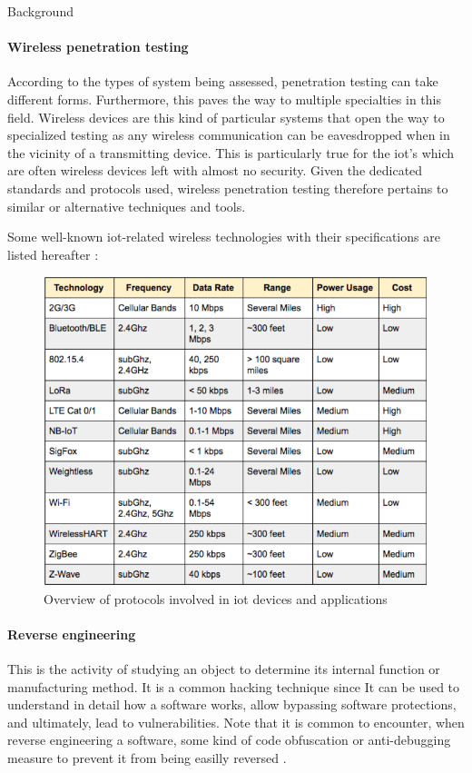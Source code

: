 \begin{chaptercover}{Background}
\paragraph{Wireless penetration testing} According to the types of system being assessed, penetration testing can take different forms. Furthermore, this paves the way to multiple specialties in this field. Wireless devices are this kind of particular systems that open the way to specialized testing as any wireless communication can be eavesdropped when in the vicinity of a transmitting device. This is particularly true for the \acrshort{iot}'s which are often wireless devices left with almost no security. Given the dedicated standards and protocols used, wireless penetration testing therefore pertains to similar or alternative techniques and tools.

Some well-known \acrshort{iot}-related wireless technologies with their specifications are listed hereafter :
\begin{figure}[H]
  \centering
  \includegraphics[width=.7\linewidth]{figures/wireless-technologies}
  \caption{Overview of protocols involved in \acrshort{iot} devices and applications \cite{iot-protocols}}
  \label{fig:wireless-technologies}
\end{figure}

\paragraph{Reverse engineering} This is the activity of studying an object to determine its internal function or manufacturing method. It is a common hacking technique since It can be used to understand in detail how a software works, allow bypassing software protections, and ultimately, lead to vulnerabilities. Note that it is common to encounter, when reverse engineering a software, some kind of code obfuscation \cite{code-obfuscation} or anti-debugging measure to prevent it from being easilly reversed \cite{anti-debugging}.


\end{chaptercover}
